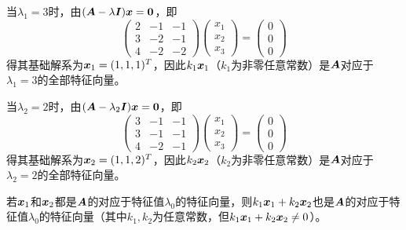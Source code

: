 \begin{frame}
\begin{jie}
    当$\lambda_1=3$时，由$(\boldsymbol{A}-\lambda\boldsymbol{I}){\boldsymbol{x}}=\boldsymbol{0}$，即
    $$
    \left(
      \begin{array}{rrr}
        2&-1&-1\\
        3&-2&-1\\
        4&-2&-2
      \end{array}
    \right)
    \left(
      \begin{array}{c}
        x_1\\
        x_2\\
        x_3
      \end{array}
    \right)=
    \left(
      \begin{array}{c}
        0\\
        0\\
        0
      \end{array}
    \right)
    $$
    得其基础解系为${\boldsymbol{x}}_1=(1,1,1)^T$，因此$k_1{\boldsymbol{x}}_1$（$k_1$为非零任意常数）是$\boldsymbol{A}$对应于$\lambda_1=3$的全部特征向量。
    \vspace{0.1in}

    当$\lambda_2=2$时，由$(\boldsymbol{A}-\lambda_2\boldsymbol{I}){\boldsymbol{x}}=\boldsymbol{0}$，即
    $$
    \left(
      \begin{array}{rrr}
        3&-1&-1\\
        3&-1&-1\\
        4&-2&-1
      \end{array}
    \right)
    \left(
      \begin{array}{c}
        x_1\\
        x_2\\
        x_3
      \end{array}
    \right)=
    \left(
      \begin{array}{c}
        0\\
        0\\
        0
      \end{array}
    \right)
    $$
    得其基础解系为${\boldsymbol{x}}_2=(1,1,2)^T$，因此$k_2{\boldsymbol{x}}_2$（$k_2$为非零任意常数）是$\boldsymbol{A}$对应于$\lambda_2=2$的全部特征向量。
  \end{jie}

\end{frame}




\begin{frame}[fragile]
\begin{dingli}
  若${\boldsymbol{x}}_1$和${\boldsymbol{x}}_2$都是$\boldsymbol{A}$的对应于特征值$\lambda_0$的特征向量，则$k_1{\boldsymbol{x}}_1+k_2{\boldsymbol{x}}_2$也是$\boldsymbol{A}$的对应于特征值$\lambda_0$的特征向量（其中$k_1,k_2$为任意常数，但$k_1{\boldsymbol{x}}_1+k_2{\boldsymbol{x}}_2\ne 0$）。
\end{dingli}
\end{frame}



